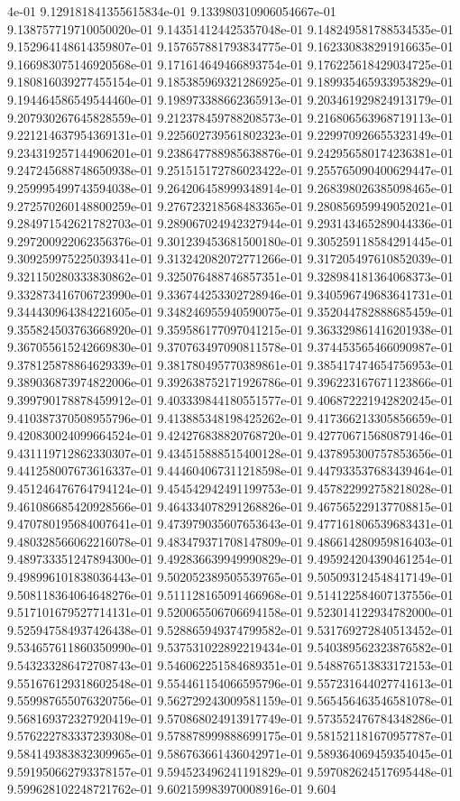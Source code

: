4e-01	9.129181841355615834e-01	9.133980310906054667e-01	9.138757719710050020e-01	9.143514124425357048e-01	9.148249581788534535e-01	9.152964148614359807e-01	9.157657881793834775e-01	9.162330838291916635e-01	9.166983075146920568e-01	9.171614649466893754e-01	9.176225618429034725e-01	9.180816039277455154e-01	9.185385969321286925e-01	9.189935465933953829e-01	9.194464586549544460e-01	9.198973388662365913e-01	9.203461929824913179e-01	9.207930267645828559e-01	9.212378459788208573e-01	9.216806563968719113e-01	9.221214637954369131e-01	9.225602739561802323e-01	9.229970926655323149e-01	9.234319257144906201e-01	9.238647788985638876e-01	9.242956580174236381e-01	9.247245688748650938e-01	9.251515172786023422e-01	9.255765090400629447e-01	9.259995499743594038e-01	9.264206458999348914e-01	9.268398026385098465e-01	9.272570260148800259e-01	9.276723218568483365e-01	9.280856959949052021e-01	9.284971542621782703e-01	9.289067024942327944e-01	9.293143465289044336e-01	9.297200922062356376e-01	9.301239453681500180e-01	9.305259118584291445e-01	9.309259975225039341e-01	9.313242082072771266e-01	9.317205497610852039e-01	9.321150280333830862e-01	9.325076488746857351e-01	9.328984181364068373e-01	9.332873416706723990e-01	9.336744253302728946e-01	9.340596749683641731e-01	9.344430964384221605e-01	9.348246955940590075e-01	9.352044782888685459e-01	9.355824503763668920e-01	9.359586177097041215e-01	9.363329861416201938e-01	9.367055615242669830e-01	9.370763497090811578e-01	9.374453565466090987e-01	9.378125878864629339e-01	9.381780495770389861e-01	9.385417474654756953e-01	9.389036873974822006e-01	9.392638752171926786e-01	9.396223167671123866e-01	9.399790178878459912e-01	9.403339844180551577e-01	9.406872221942820245e-01	9.410387370508955796e-01	9.413885348198425262e-01	9.417366213305856659e-01	9.420830024099664524e-01	9.424276838820768720e-01	9.427706715680879146e-01	9.431119712862330307e-01	9.434515888515400128e-01	9.437895300757853656e-01	9.441258007673616337e-01	9.444604067311218598e-01	9.447933537683439464e-01	9.451246476764794124e-01	9.454542942491199753e-01	9.457822992758218028e-01	9.461086685420928566e-01	9.464334078291268826e-01	9.467565229137708815e-01	9.470780195684007641e-01	9.473979035607653643e-01	9.477161806539683431e-01	9.480328566062216078e-01	9.483479371708147809e-01	9.486614280959816403e-01	9.489733351247894300e-01	9.492836639949990829e-01	9.495924204390461254e-01	9.498996101838036443e-01	9.502052389505539765e-01	9.505093124548417149e-01	9.508118364064648276e-01	9.511128165091466968e-01	9.514122584607137556e-01	9.517101679527714131e-01	9.520065506706694158e-01	9.523014122934782000e-01	9.525947584937426438e-01	9.528865949374799582e-01	9.531769272840513452e-01	9.534657611860350990e-01	9.537531022892219434e-01	9.540389562323876582e-01	9.543233286472708743e-01	9.546062251584689351e-01	9.548876513833172153e-01	9.551676129318602548e-01	9.554461154066595796e-01	9.557231644027741613e-01	9.559987655076320756e-01	9.562729243009581159e-01	9.565456463546581078e-01	9.568169372327920419e-01	9.570868024913917749e-01	9.573552476784348286e-01	9.576222783337239308e-01	9.578878999888699175e-01	9.581521181670957787e-01	9.584149383832309965e-01	9.586763661436042971e-01	9.589364069459354045e-01	9.591950662793378157e-01	9.594523496241191829e-01	9.597082624517695448e-01	9.599628102248721762e-01	9.602159983970008916e-01	9.604